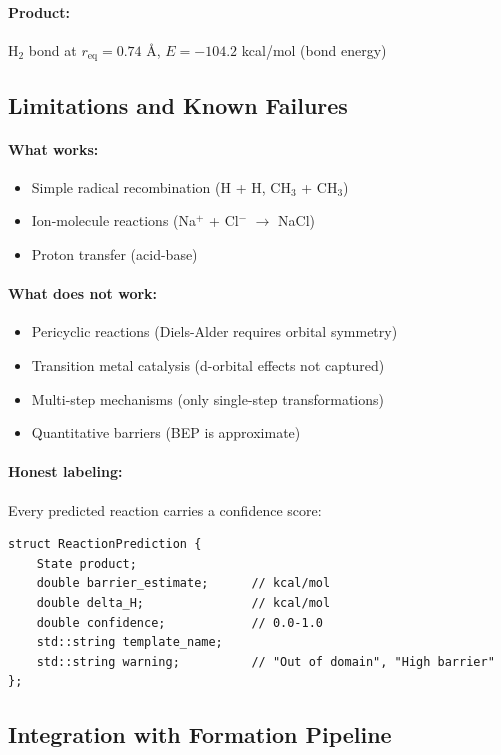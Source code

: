 \documentclass[11pt]{article}
\begin{document}
\paragraph{Product:} H$_2$ bond at $r_{\text{eq}} = 0.74$ \AA, $E = -104.2$ kcal/mol (bond energy)

\subsection{Limitations and Known Failures}

\paragraph{What works:}
\begin{itemize}
\item Simple radical recombination (H + H, CH$_3$ + CH$_3$)
\item Ion-molecule reactions (Na$^+$ + Cl$^-$ $\to$ NaCl)
\item Proton transfer (acid-base)
\end{itemize}

\paragraph{What does not work:}
\begin{itemize}
\item Pericyclic reactions (Diels-Alder requires orbital symmetry)
\item Transition metal catalysis (d-orbital effects not captured)
\item Multi-step mechanisms (only single-step transformations)
\item Quantitative barriers (BEP is approximate)
\end{itemize}

\paragraph{Honest labeling:} Every predicted reaction carries a confidence score:
\begin{lstlisting}
struct ReactionPrediction {
    State product;
    double barrier_estimate;      // kcal/mol
    double delta_H;               // kcal/mol
    double confidence;            // 0.0-1.0
    std::string template_name;
    std::string warning;          // "Out of domain", "High barrier"
};
\end{lstlisting}

\subsection{Integration with Formation Pipeline}
\end{document}
